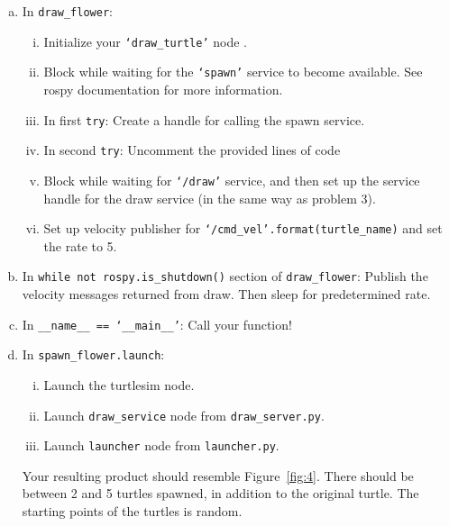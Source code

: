 \begin{enumerate}[(a)]
  \item In \texttt{draw\_flower}:
  \begin{enumerate}[i.]
    \item Initialize your \texttt{`draw\_turtle'} node
    .
    \item Block while waiting for the \texttt{`spawn'} service to become available. See rospy documentation for more information.
    \item In first \texttt{try}: Create a handle for calling the spawn service.
    \item In second \texttt{try}: Uncomment the provided lines of code
    \item Block while waiting for \texttt{`/draw'} service, and then set up the service handle for the draw service (in the same way as problem 3). %
    \item Set up velocity publisher for \texttt{`{}/cmd\_vel'.format(turtle\_name)} and set the rate to 5.
  \end{enumerate}
  
  
  
  \item In \texttt{while not rospy.is\_shutdown()} section of \texttt{draw\_flower}: Publish the velocity messages returned from draw. Then sleep for predetermined rate.
  \item In \texttt{\_\_name\_\_ == `\_\_main\_\_'}: Call your function!
  \item In \texttt{spawn\_flower.launch}:
  \begin{enumerate}[i.]
    \item Launch the turtlesim node.
    \item Launch \texttt{draw\_service} node from \texttt{draw\_server.py}.
    \item  Launch \texttt{launcher} node from \texttt{launcher.py}.
  \end{enumerate}
  Your resulting product should resemble Figure~\ref{fig:4}. There should be between 2 and 5 turtles spawned, in addition to the original turtle. The starting points of the turtles is random.


\end{enumerate}


